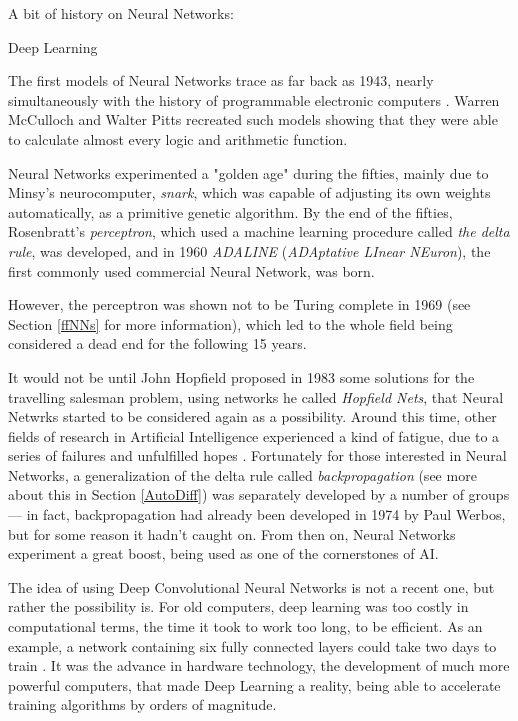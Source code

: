 \documentclass[titlepage]{article}
\theoremstyle{plain}
\theoremstyle{definition}
\begin{document}
		A bit of history on Neural Networks:
		\begin{labeling}{Deep Learning}
			\item[Early years]	The first models of Neural Networks trace as far back as 1943, nearly simultaneously with the history of programmable electronic computers \cite{Kriesel}. Warren McCulloch and Walter Pitts recreated such models showing that they were able to calculate almost every logic and arithmetic function.
			
			\item[Rise]	Neural Networks experimented a "golden age" during the fifties, mainly due to Minsy's neurocomputer, \textit{snark}, which was capable of adjusting its own weights automatically, as a primitive genetic algorithm. By the end of the fifties, Rosenbratt's \textit{perceptron}, which used a machine learning procedure called \textit{the delta rule}, was developed, and in 1960 \textit{ADALINE} (\textit{ADAptative LInear NEuron}), the first commonly used commercial Neural Network, was born.
			
			\item[Decline] 	However, the perceptron was shown not to be Turing complete in 1969 (see Section \ref{ffNNs} for more information), which led to the whole field being considered a dead end for the following 15 years.
			
			\item[Renaissance] It would not be until John Hopfield proposed in 1983 some solutions for the travelling salesman problem, using networks he called \textit{Hopfield Nets}, that Neural Netwrks started to be considered again as a possibility. Around this time, other fields of research in Artificial Intelligence experienced a kind of fatigue, due to a series of failures and unfulfilled hopes \cite{Kriesel}. Fortunately for those interested in Neural Networks, a generalization of the delta rule called \textit{backpropagation} (see more about this in Section \ref{AutoDiff}) was separately developed by a number of groups --- in fact, backpropagation had already been developed in 1974 by Paul Werbos, but for some reason it hadn't caught on. From then on, Neural Networks experiment a great boost, being used as one of the cornerstones of AI.
			
			\item[Deep Learning] The idea of using Deep Convolutional Neural Networks is not a recent one, but rather the possibility is. For old computers, deep learning was too costly in computational terms, the time it took to work too long, to be efficient. As an example, a network containing six fully connected layers could take two days to train \cite{Hinton}. It was the advance in hardware technology, the development of much more powerful computers, that made Deep Learning a reality, being able to accelerate training algorithms by orders of magnitude.
		\end{labeling}
\end{document}
